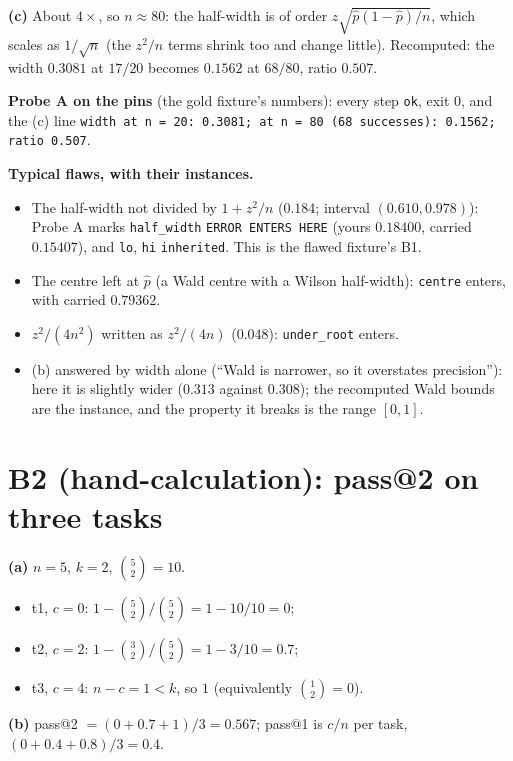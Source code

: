 \documentclass[11pt]{article}
\begin{document}
\textbf{(c)} About $4\times$, so $n \approx 80$: the half-width is of order
$z\sqrt{\hat p(1-\hat p)/n}$, which scales as $1/\sqrt{n}$ (the $z^2/n$ terms
shrink too and change little). Recomputed: the width $0.3081$ at $17/20$
becomes $0.1562$ at $68/80$, ratio $0.507$.

\textbf{Probe A on the pins} (the gold fixture's numbers): every step
\texttt{ok}, exit 0, and the (c) line
\texttt{width at n = 20: 0.3081; at n = 80 (68 successes): 0.1562; ratio 0.507}.

\textbf{Typical flaws, with their instances.}
\begin{itemize}
\item The half-width not divided by $1 + z^2/n$ ($0.184$; interval
  $(0.610, 0.978)$): Probe A marks \texttt{half\_width} \texttt{ERROR ENTERS
  HERE} (yours $0.18400$, carried $0.15407$), and \texttt{lo}, \texttt{hi}
  \texttt{inherited}. This is the flawed fixture's B1.
\item The centre left at $\hat p$ (a Wald centre with a Wilson half-width):
  \texttt{centre} enters, with carried $0.79362$.
\item $z^2/(4n^2)$ written as $z^2/(4n)$ ($0.048$): \texttt{under\_root}
  enters.
\item (b) answered by width alone (``Wald is narrower, so it overstates
  precision''): here it is slightly wider ($0.313$ against $0.308$); the
  recomputed Wald bounds are the instance, and the property it breaks is the
  range $[0, 1]$.
\end{itemize}

\section*{B2 (hand-calculation): pass@2 on three tasks}

\textbf{(a)} $n = 5$, $k = 2$, $\binom{5}{2} = 10$.
\begin{itemize}
\item t1, $c = 0$: $1 - \binom{5}{2}/\binom{5}{2} = 1 - 10/10 = 0$;
\item t2, $c = 2$: $1 - \binom{3}{2}/\binom{5}{2} = 1 - 3/10 = 0.7$;
\item t3, $c = 4$: $n - c = 1 < k$, so $1$ (equivalently $\binom{1}{2} = 0$).
\end{itemize}

\textbf{(b)} pass@2 $= (0 + 0.7 + 1)/3 = 0.567$; pass@1 is $c/n$ per task,
$(0 + 0.4 + 0.8)/3 = 0.4$.
\end{document}
